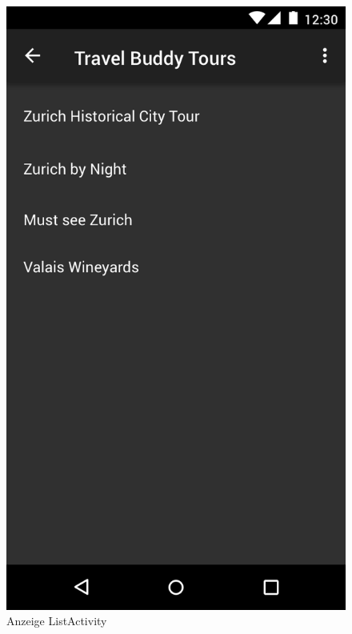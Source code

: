 \documentclass[a4paper,10pt,xetex]{article}
\begin{document}
\begin{figure}
  \centering
  \begin{minipage}[b]{0.48\textwidth}
    \includegraphics[width=\textwidth]{ListActivity}
    \caption{Anzeige ListActivity}
  \end{minipage}
  \hfill
  \begin{minipage}[b]{0.48\textwidth}

\end{minipage}
\end{figure}
\end{document}

